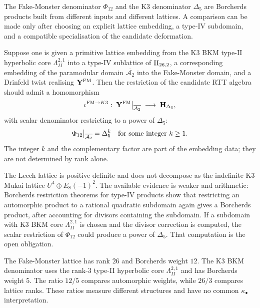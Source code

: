 The Fake-Monster denominator $\Phi_{12}$ and the K3 denominator
$\Delta_5$ are Borcherds products built from different inputs and
different lattices. A comparison can be made only after choosing an
explicit lattice embedding, a type-IV subdomain, and a compatible
specialisation of the candidate deformation.

\begin{conjecture}
\label{conj:fm-k3-phi-descent}
\ClaimStatusConjectured
{}
Suppose one is given a primitive lattice embedding from the K3 BKM
type-II hyperbolic core $\Lambda^{2,1}_{II}$ into a type-IV sublattice of
$\mathrm{II}_{26,2}$, a corresponding embedding of the paramodular domain
$\overline{\mathcal{A}_2}$ into the Fake-Monster domain, and a
Drinfeld twist realising $\mathbf{Y}^{\mathrm{FM}}$. Then the restriction of the candidate
RTT algebra should admit a homomorphism
\[
 \iota^{\mathrm{FM}\to K3}:\; \mathbf{Y}^{\mathrm{FM}}\big|_{\overline{\mathcal{A}_2}} \;\longrightarrow\; \mathbf{H}_{\Delta_5},
\]
with scalar denominator restricting to a power of $\Delta_5$:
\[
 \Phi_{12}\big|_{\overline{\mathcal{A}_2}} = \Delta_5^k
 \quad\text{for some integer } k\geq 1.
\]
The integer $k$ and the complementary factor are part of the embedding
data; they are not determined by rank alone.
\end{conjecture}

\begin{remark}
\label{rem:fm-k3-phi-descent-evidence}
The Leech lattice is positive definite and does not decompose as the
indefinite K3 Mukai lattice $U^4\oplus E_8(-1)^2$. The available
evidence is weaker and arithmetic: Borcherds restriction theorems for
type-IV products show that restricting an automorphic product to a
rational quadratic subdomain again gives a Borcherds product, after
accounting for divisors containing the subdomain. If a subdomain with
K3 BKM core $\Lambda^{2,1}_{II}$ is chosen and the divisor
correction is computed, the scalar restriction of $\Phi_{12}$ could
produce a power of $\Delta_5$. That computation is the open obligation.
\end{remark}

\begin{remark}
\label{rem:fm-rank-26-vs-5}
The Fake-Monster lattice has rank $26$ and Borcherds weight $12$. The
K3 BKM denominator uses the rank-$3$ type-II hyperbolic core
$\Lambda^{2,1}_{II}$ and has Borcherds weight $5$. The ratio
$12/5$ compares automorphic weights, while $26/3$ compares lattice
ranks. These ratios measure different structures and have no common
$\kappa_\bullet$ interpretation.
\end{remark}


